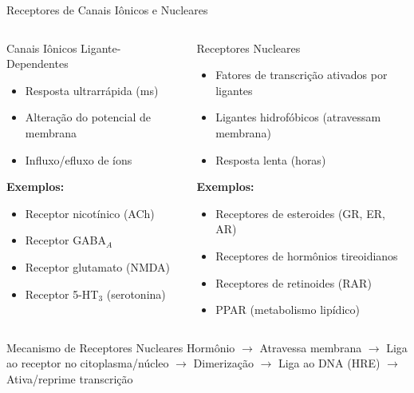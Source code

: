 \begin{frame}{Receptores de Canais Iônicos e Nucleares}
\begin{columns}
\begin{block}{Canais Iônicos Ligante-Dependentes}
\begin{itemize}
    \item Resposta ultrarrápida (ms)
    \item Alteração do potencial de membrana
    \item Influxo/efluxo de íons
\end{itemize}

\textbf{Exemplos:}
\begin{itemize}
    \item Receptor nicotínico (ACh)
    \item Receptor GABA$_A$
    \item Receptor glutamato (NMDA)
    \item Receptor 5-HT$_3$ (serotonina)
\end{itemize}
\end{block}

\begin{block}{Receptores Nucleares}
\begin{itemize}
    \item Fatores de transcrição ativados por ligantes
    \item Ligantes hidrofóbicos (atravessam membrana)
    \item Resposta lenta (horas)
\end{itemize}

\textbf{Exemplos:}
\begin{itemize}
    \item Receptores de esteroides (GR, ER, AR)
    \item Receptores de hormônios tireoidianos
    \item Receptores de retinoides (RAR)
    \item PPAR (metabolismo lipídico)
\end{itemize}
\end{block}
\end{columns}

\vspace{0.3cm}

\begin{exampleblock}{Mecanismo de Receptores Nucleares}
Hormônio $\rightarrow$ Atravessa membrana $\rightarrow$ Liga ao receptor no citoplasma/núcleo $\rightarrow$ Dimerização $\rightarrow$ Liga ao DNA (HRE) $\rightarrow$ Ativa/reprime transcrição
\end{exampleblock}
\end{frame}

